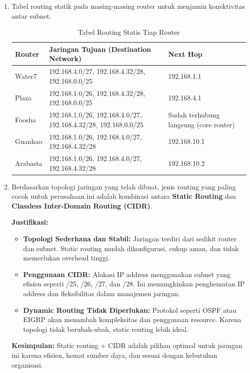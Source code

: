 \begin{enumerate}
	\item Tabel routing statik pada masing-masing router untuk menjamin konektivitas antar subnet.
	\begin{table}[H]
	\centering
	\caption{Tabel Routing Statis Tiap Router}
	\small
	\begin{tabular}{|p{2cm}|p{4cm}|p{5cm}|}
	\hline
	\textbf{Router} & \textbf{Jaringan Tujuan (Destination Network)} & \textbf{Next Hop} \\ \hline
	Water7 & 192.168.4.0/27, 192.168.4.32/28, 192.168.0.0/25 & 192.168.1.1 \\ \hline
	Plaza & 192.168.1.0/26, 192.168.4.32/28, 192.168.0.0/25 & 192.168.4.1 \\ \hline
	Foosha & 192.168.1.0/26, 192.168.4.0/27, 192.168.4.32/28, 192.168.0.0/25 & Sudah terhubung langsung (core router) \\ \hline
	Guanhao & 192.168.1.0/26, 192.168.4.0/27, 192.168.4.32/28 & 192.168.10.1 \\ \hline
	Arabasta & 192.168.1.0/26, 192.168.4.0/27, 192.168.4.32/28 & 192.168.10.2 \\ \hline
	\end{tabular}
	\label{tab:routing_table}
	\end{table}

	\item Berdasarkan topologi jaringan yang telah dibuat, jenis routing yang paling cocok untuk perusahaan ini adalah kombinasi antara \textbf{Static Routing} dan \textbf{Classless Inter-Domain Routing (CIDR)}.

	\textbf{Justifikasi:}
	\begin{itemize}
		\item \textbf{Topologi Sederhana dan Stabil:} Jaringan terdiri dari sedikit router dan subnet. Static routing mudah dikonfigurasi, cukup aman, dan tidak memerlukan overhead tinggi.
		
		\item \textbf{Penggunaan CIDR:} Alokasi IP address menggunakan subnet yang efisien seperti /25, /26, /27, dan /28. Ini memungkinkan penghematan IP address dan fleksibilitas dalam manajemen jaringan.
		
		\item \textbf{Dynamic Routing Tidak Diperlukan:} Protokol seperti OSPF atau EIGRP akan menambah kompleksitas dan penggunaan resource. Karena topologi tidak berubah-ubah, static routing lebih ideal.
	\end{itemize}

	\textbf{Kesimpulan:} Static routing + CIDR adalah pilihan optimal untuk jaringan ini karena efisien, hemat sumber daya, dan sesuai dengan kebutuhan organisasi.
\end{enumerate}

